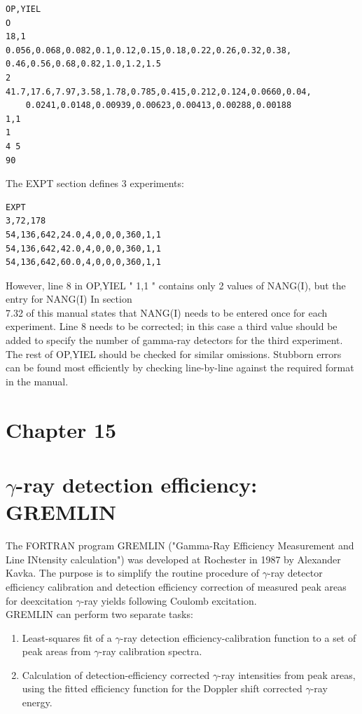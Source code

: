 \documentclass[10pt]{article}
\begin{document}
\begin{verbatim}
OP,YIEL
O
18,1
0.056,0.068,0.082,0.1,0.12,0.15,0.18,0.22,0.26,0.32,0.38,
0.46,0.56,0.68,0.82,1.0,1.2,1.5
2
41.7,17.6,7.97,3.58,1.78,0.785,0.415,0.212,0.124,0.0660,0.04,
    0.0241,0.0148,0.00939,0.00623,0.00413,0.00288,0.00188
1,1
1
4 5
90
\end{verbatim}

The EXPT section defines 3 experiments:

\begin{verbatim}
EXPT
3,72,178
54,136,642,24.0,4,0,0,0,360,1,1
54,136,642,42.0,4,0,0,0,360,1,1
54,136,642,60.0,4,0,0,0,360,1,1
\end{verbatim}

However, line 8 in OP,YIEL " 1,1 " contains only 2 values of NANG(I), but the entry for NANG(I) In section\\
7.32 of this manual states that NANG(I) needs to be entered once for each experiment. Line 8 needs to be corrected; in this case a third value should be added to specify the number of gamma-ray detectors for the third experiment. The rest of OP,YIEL should be checked for similar omissions. Stubborn errors can be found most efficiently by checking line-by-line against the required format in the manual.

\section*{Chapter 15}
\section*{$\gamma$-ray detection efficiency: GREMLIN }
The FORTRAN program GREMLIN ("Gamma-Ray Efficiency Measurement and Line INtensity calculation") was developed at Rochester in 1987 by Alexander Kavka. The purpose is to simplify the routine procedure of $\gamma$-ray detector efficiency calibration and detection efficiency correction of measured peak areas for deexcitation $\gamma$-ray yields following Coulomb excitation.\\
GREMLIN can perform two separate tasks:

\begin{enumerate}
  \item Least-squares fit of a $\gamma$-ray detection efficiency-calibration function to a set of peak areas from $\gamma$-ray calibration spectra.
  \item Calculation of detection-efficiency corrected $\gamma$-ray intensities from peak areas, using the fitted efficiency function for the Doppler shift corrected $\gamma$-ray energy.
\end{enumerate}
\end{document}
